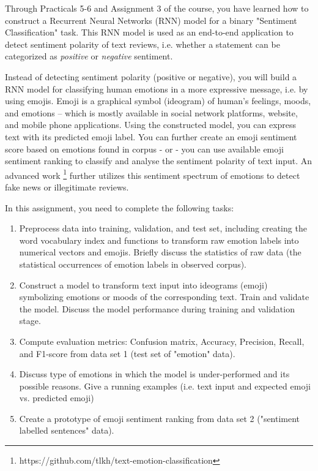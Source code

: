 \documentclass[a4paper,twoside,10pt]{article}
\begin{document}
\justify
Through Practicals 5-6 and Assignment 3 of the course, you have learned how to construct a Recurrent Neural Networks (RNN) model for a binary "Sentiment Classification" task.  This RNN model is used as an end-to-end application to detect sentiment polarity of text reviews, i.e. whether a statement can be categorized as \textit{positive} or \textit{negative} sentiment.

\justify
Instead of detecting sentiment polarity (positive or negative), you will build a RNN model for classifying human emotions in a more expressive message, i.e. by using emojis. Emoji is a graphical symbol (ideogram) of human's feelings, moods, and emotions -- which is mostly available in social network platforms, website, and mobile phone applications. Using the constructed model, you can express text with its predicted emoji label. You can further create an emoji sentiment score based on emotions found in corpus - or - you can use available emoji sentiment ranking to classify and analyse the sentiment polarity of text input. An advanced work \footnote{https://github.com/tlkh/text-emotion-classification} further utilizes this sentiment spectrum of emotions to detect fake news or illegitimate reviews.

\justify
In this assignment, you need to complete the following tasks:

\begin{enumerate}
    \item Preprocess data into training, validation, and test set, including creating the word vocabulary index and functions to transform raw emotion labels into numerical vectors and emojis. Briefly discuss the statistics of raw data (the statistical occurrences of emotion labels in observed corpus). 
    \item Construct a model to transform text input into ideograms (emoji) symbolizing emotions or moods of the corresponding text. Train and validate the model. Discuss the model performance during training and validation stage.
    \item Compute evaluation metrics: Confusion matrix, Accuracy, Precision, Recall, and F1-score from data set 1 (test set of "emotion" data).
    \item Discuss type of emotions in which the model is under-performed and its possible reasons. Give a running examples (i.e. text input and expected emoji vs. predicted emoji)
    \item Create a prototype of emoji sentiment ranking from data set 2 ("sentiment labelled sentences" data).
    
\end{enumerate}
\end{document}
